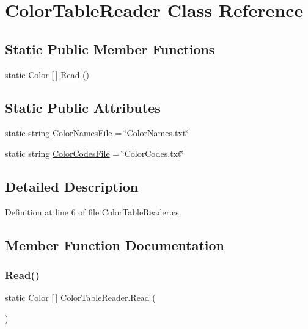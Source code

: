 \hypertarget{class_color_table_reader}{}\section{Color\+Table\+Reader Class Reference}
\label{class_color_table_reader}
\subsection*{Static Public Member Functions}
\begin{DoxyCompactItemize}
\item 
static Color \mbox{[}$\,$\mbox{]} \mbox{\hyperlink{class_color_table_reader_a1f2fad4817dee685e730ddd8774deab4}{Read}} ()
\end{DoxyCompactItemize}
\subsection*{Static Public Attributes}
\begin{DoxyCompactItemize}
\item 
static string \mbox{\hyperlink{class_color_table_reader_a1b5e976c34598413c6c0dbc371ce9483}{Color\+Names\+File}} = \char`\"{}Color\+Names.\+txt\char`\"{}
\item 
static string \mbox{\hyperlink{class_color_table_reader_ab8722a8a147e2cef30b8334a5f5797a5}{Color\+Codes\+File}} = \char`\"{}Color\+Codes.\+txt\char`\"{}
\end{DoxyCompactItemize}


\subsection{Detailed Description}


Definition at line 6 of file Color\+Table\+Reader.\+cs.



\subsection{Member Function Documentation}
\mbox{\label{class_color_table_reader_a1f2fad4817dee685e730ddd8774deab4}} 
\subsubsection{\texorpdfstring{Read()}{Read()}}
{\footnotesize\ttfamily static Color \mbox{[}$\,$\mbox{]} Color\+Table\+Reader.\+Read (\begin{DoxyParamCaption}{ }\end{DoxyParamCaption})\hspace{0.3cm}{\ttfamily [static]}}



